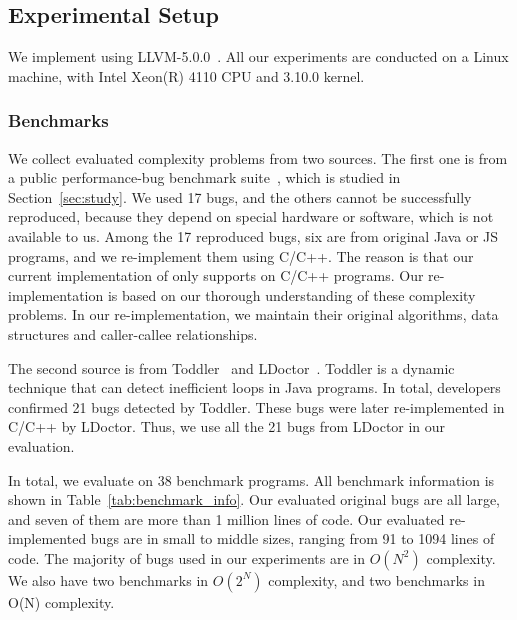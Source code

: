 \subsection{Experimental Setup}

We implement \Tool using LLVM-5.0.0~\cite{llvm}. 
All our experiments are conducted on a Linux machine, 
with Intel Xeon(R) 4110 CPU and 3.10.0 kernel.





\subsubsection{Benchmarks}

We collect evaluated complexity problems from two sources. 
The first one is
from a public performance-bug benchmark 
suite~\cite{PerfBug,SongOOPSLA2014,ldoctor}, which is
studied in Section~\ref{sec:study}.
We used 17 bugs, and the others cannot be successfully
reproduced, because they depend on special hardware 
or software, which is not available to us. 
Among the 17 reproduced bugs, six are from
original Java or JS programs, 
and we re-implement them using C/C++.
The reason is that our current implementation of \Tool 
only supports on C/C++ programs.
Our re-implementation is based on our thorough 
understanding of these complexity problems.
In our re-implementation, we maintain 
their original algorithms, 
data structures and caller-callee relationships. 


The second source is from Toddler~\cite{Alabama} and LDoctor~\cite{ldoctor}. 
Toddler is a dynamic technique that can detect inefficient loops in Java programs.
In total, developers confirmed 21 bugs detected by Toddler. 
These bugs were later re-implemented in C/C++ by LDoctor. 
Thus, we use all the 21 bugs from LDoctor in our evaluation.  


In total, we evaluate \Tool on 38 benchmark programs. 
All benchmark information is shown in Table~\ref{tab:benchmark_info}. 
Our evaluated original bugs are all large, and seven of them 
are more than 1 million lines of code.
Our evaluated re-implemented bugs are in small to middle sizes, 
ranging from 91 to 1094 lines of code. 
The majority of bugs used in our experiments are in $O(N^2)$ complexity. 
We also have two benchmarks in $O(2^N)$ complexity, 
and two benchmarks in O(N) complexity.

